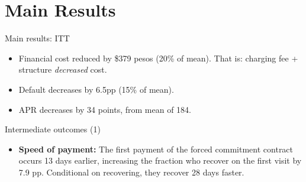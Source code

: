 \documentclass[8pt]{beamer}
\begin{document}
\section{Main Results}
\begin{frame}{Main results: ITT}
\label{main_results}


\begin{itemize}
    \item Financial cost reduced by \$379 pesos (20\% of mean). That is: charging fee + structure \textit{decreased} cost.
    \item Default decreases by 6.5pp (15\% of mean).
    \item APR decreases by 34 points, from mean of 184.
\end{itemize}
\vspace{.3in}
\begin{table}[H]
\begin{center}
\resizebox{0.95\textwidth}{!}{
\small{}
}
\end{center}
\end{table}

   \vfill 

\end{frame}








\begin{frame}{Intermediate outcomes (1)}
\label{mechanism_appendix}

\begin{table}[H]
\caption{Intermediate outcomes}
\begin{center}
\scriptsize{}
\end{center}
\end{table}
\vfill
 \begin{itemize}
     \item \textbf{Speed of payment:} The first payment of the forced commitment contract  occurs 13 days earlier, increasing the fraction who recover on the first visit by 7.9 pp. Conditional on recovering, they recover 28 days faster.
\end{itemize}
\end{frame}
\end{document}
